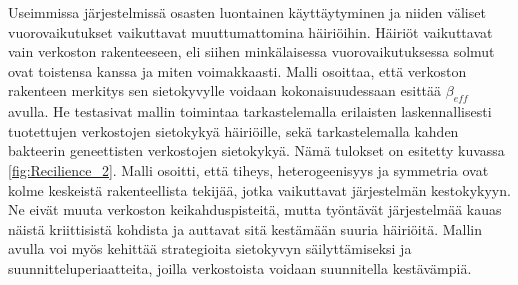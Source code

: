\documentclass[finnish,12pt,a4paper,pdftex,elec,utf8]{aaltothesis}
\begin{document}
Useimmissa järjestelmissä osasten luontainen käyttäytyminen ja niiden väliset vuorovaikutukset vaikuttavat muuttumattomina häiriöihin. Häiriöt vaikuttavat vain verkoston rakenteeseen, eli siihen minkälaisessa vuorovaikutuksessa solmut ovat toistensa kanssa ja miten voimakkaasti. Malli osoittaa, että verkoston rakenteen merkitys sen sietokyvylle voidaan kokonaisuudessaan esittää $\beta_{eff}$ avulla. He testasivat mallin toimintaa tarkastelemalla erilaisten laskennallisesti tuotettujen verkostojen sietokykyä häiriöille, sekä tarkastelemalla kahden bakteerin geneettisten verkostojen sietokykyä. Nämä tulokset on esitetty kuvassa \ref{fig:Recilience_2}. Malli osoitti, että tiheys, heterogeenisyys ja symmetria ovat kolme keskeistä rakenteellista tekijää, jotka vaikuttavat järjestelmän kestokykyyn. Ne eivät muuta verkoston keikahduspisteitä, mutta työntävät järjestelmää kauas näistä kriittisistä kohdista ja auttavat sitä kestämään suuria häiriöitä. Mallin avulla voi myös kehittää strategioita sietokyvyn säilyttämiseksi ja suunnitteluperiaatteita, joilla verkostoista voidaan suunnitella kestävämpiä. \cite{Universal-resilience}
\end{document}
